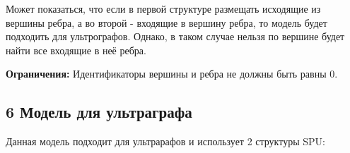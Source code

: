 Может показаться, что если в первой структуре размещать исходящие из вершины ребра, а во второй -\/ входящие в вершину ребра, то модель будет подходить для ультрографов. Однако, в таком случае нельзя по вершине будет найти все входящие в неё ребра.

{\bfseries Ограничения\+:} Идентификаторы вершины и ребра не должны быть равны 0.\hypertarget{md_docs__xD0_x93_xD1_x80_xD0_xB0_xD1_x84_xD0_xBE_xD0_xB2_xD1_x8B_xD0_xB5__xD0_xBC_xD0_xBE_xD0_xB4_xD0_xB5_xD0_xBB_xD0_xB8_autotoc_md9}{}\subsection{6 Модель для ультраграфа}\label{md_docs__xD0_x93_xD1_x80_xD0_xB0_xD1_x84_xD0_xBE_xD0_xB2_xD1_x8B_xD0_xB5__xD0_xBC_xD0_xBE_xD0_xB4_xD0_xB5_xD0_xBB_xD0_xB8_autotoc_md9}
Данная модель подходит для ультрарафов и использует 2 структуры S\+PU\+:


